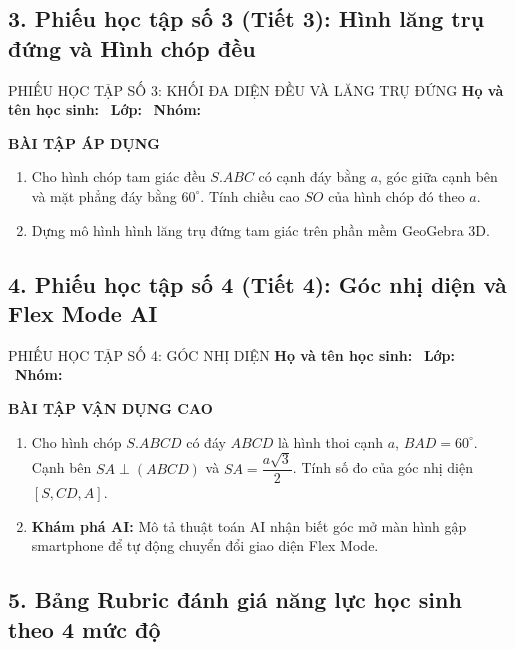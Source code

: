 \documentclass[12pt, a4paper]{article}
\begin{document}
\subsection*{3. Phiếu học tập số 3 (Tiết 3): Hình lăng trụ đứng và Hình chóp đều}

\begin{pedabox}{PHIẾU HỌC TẬP SỐ 3: KHỐI ĐA DIỆN ĐỀU VÀ LĂNG TRỤ ĐỨNG}
\textbf{Họ và tên học sinh:} \dotfill \ \textbf{Lớp:} \dotfill \ \textbf{Nhóm:} \dotfill

\noindent \textbf{BÀI TẬP ÁP DỤNG}
\begin{enumerate}[leftmargin=0.6cm]
    \item Cho hình chóp tam giác đều $S.ABC$ có cạnh đáy bằng $a$, góc giữa cạnh bên và mặt phẳng đáy bằng $60^\circ$.
    Tính chiều cao $SO$ của hình chóp đó theo $a$.
    \item Dựng mô hình hình lăng trụ đứng tam giác trên phần mềm GeoGebra 3D.
\end{enumerate}
\end{pedabox}

\subsection*{4. Phiếu học tập số 4 (Tiết 4): Góc nhị diện và Flex Mode AI}

\begin{pedabox}{PHIẾU HỌC TẬP SỐ 4: GÓC NHỊ DIỆN}
\textbf{Họ và tên học sinh:} \dotfill \ \textbf{Lớp:} \dotfill \ \textbf{Nhóm:} \dotfill

\noindent \textbf{BÀI TẬP VẬN DỤNG CAO}
\begin{enumerate}[leftmargin=0.6cm]
    \item Cho hình chóp $S.ABCD$ có đáy $ABCD$ là hình thoi cạnh $a$, $\widehat{BAD} = 60^\circ$. Cạnh bên $SA \perp (ABCD)$ và $SA = \dfrac{a\sqrt{3}}{2}$.
    Tính số đo của góc nhị diện $[S, CD, A]$.
    \item \textbf{Khám phá AI:} Mô tả thuật toán AI nhận biết góc mở màn hình gập smartphone để tự động chuyển đổi giao diện Flex Mode.
\end{enumerate}
\end{pedabox}

\subsection*{5. Bảng Rubric đánh giá năng lực học sinh theo 4 mức độ}
\end{document}
